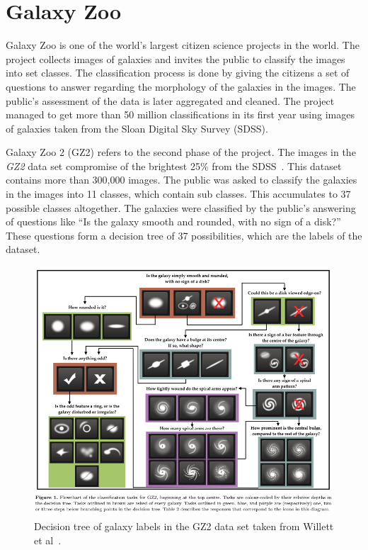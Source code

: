 \documentclass[12pt,a4paper,oneside,oldfontcommands]{memoir}
\begin{document}
\section{Galaxy Zoo}
Galaxy Zoo is one of the world’s largest citizen science projects in the world. The project collects images of galaxies and invites the public to classify the images into set classes. The classification process is done by giving the citizens a set of questions to answer regarding the morphology of the galaxies in the images.  The public's assessment of the data is later aggregated and cleaned. The project managed to get more than 50 million classifications in its first year using images of galaxies taken from the Sloan Digital Sky Survey (SDSS). 

Galaxy Zoo 2 (GZ2) refers to the second phase of the project. The images in the \textit{GZ2} data set compromise of the brightest 25\% from the SDSS~\cite{Willett}. This dataset contains more than 300,000 images. The public was asked to classify the galaxies in the images into 11 classes, which contain sub classes. This accumulates to 37 possible classes altogether. The galaxies were classified by the public’s answering of questions like “Is the galaxy smooth and rounded, with no sign of a disk?” These questions form a decision tree of 37 possibilities, which are the labels of the dataset. 

    \begin{figure}[ht]
    \center
      \includegraphics[width=\linewidth]{images/gz-2-decision-tree.png}
      \caption{Decision tree of galaxy labels in the GZ2 data set taken from Willett et al~\cite{Willett}.}
      \label{fig:GZ2-Decision-Tree}
    \end{figure}
\end{document}
